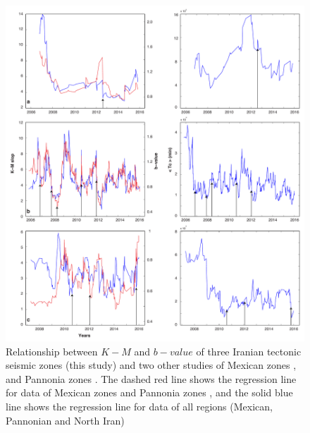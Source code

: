  
 \begin{figure} [ht]
\centering
\includegraphics[scale=0.34]{figures/pdf/Figure08.pdf} 
\caption{ Relationship between $K-M$ and $b-value$ of three Iranian tectonic seismic zones (this study) and two other studies of Mexican zones \citep{Telesca2013}, and Pannonia zones \citep{Telesca2014}. The dashed red line shows the regression line for data of  Mexican zones and Pannonia zones \citep{Telesca2014}, and the solid blue line shows the regression line for data of all regions (Mexican, Pannonian and North Iran)}
\label{fig:tc}
\end{figure}
 
 
 
 
 
 
 